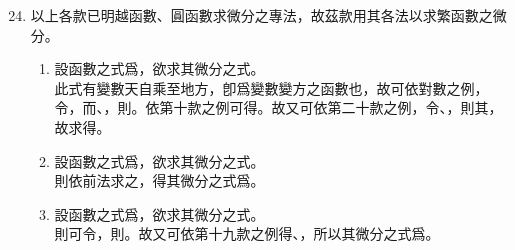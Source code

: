 \begin{enumerate} [label={第\chinese*款},nolistsep]
	\setcounter{enumi}{23}
	\item 以上各款已明越函數、圓函數求微分之專法，故茲款用其各法以求繁函數之微分。
	\begin{enumerate} [label={\chinese*題}]
		\item 設函數之式爲\CJKmove，欲求其微分之式。\\
		此式有變數天自乘至地方，卽爲變數變方之函數也，故可依對數之例，令\CJKmove，而\CJKmove、\CJKmove，則\CJKmove。依第十款之例可得\CJKmove。故又可依第二十款之例，令\CJKmove、\CJKmove，則其\CJKmove，\\故求得\CJKmove。
	\item 設函數之式爲\CJKmove，欲求其微分之式。\\
	則依前法求之，得其微分之式爲\CJKmove。
	\item 設函數之式爲\CJKmove，欲求其微分之式。\\
	則可令\CJKmove，則\CJKmove。故又可依第十九款之例得\CJKmove、\CJKmove，所以其微分之式爲\CJKmove。

\end{enumerate}
\end{enumerate}
